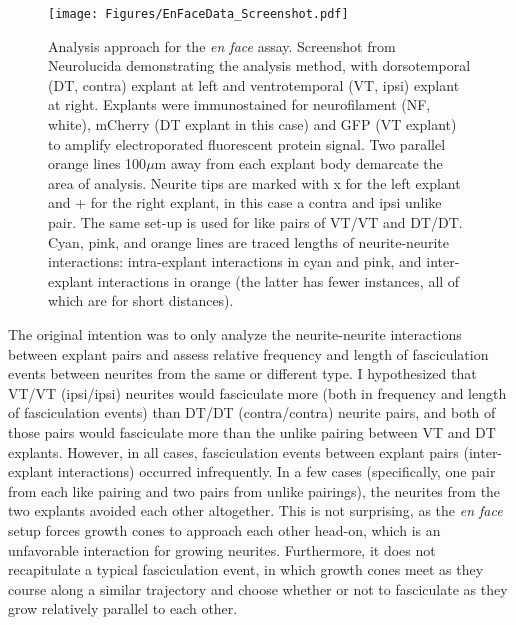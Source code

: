 \begin{figure}[hbtp]
    \begin{center}
        \texttt{[image: Figures/EnFaceData\_Screenshot.pdf]}
        \caption[Analysis approach for the \emph{en face} assay.]
        {Analysis approach for the \emph{en face} assay.
        Screenshot from Neurolucida demonstrating the analysis method, with dorsotemporal (DT, contra) explant at left and ventrotemporal (VT, ipsi) explant at right.
        Explants were immunostained for neurofilament (NF, white), mCherry (DT explant in this case) and GFP (VT explant) to amplify electroporated fluorescent protein signal.
        Two parallel orange lines 100$\mu$m away from each explant body demarcate the area of analysis.
        Neurite tips are marked with x for the left explant and + for the right explant, in this case a contra and ipsi unlike pair.
        The same set-up is used for like pairs of VT/VT and DT/DT.
        Cyan, pink, and orange lines are traced lengths of neurite-neurite interactions: intra-explant interactions in cyan and pink, and inter-explant interactions in orange (the latter has fewer instances, all of which are for short distances).}
        \label{EnFaceDataScreenshot}
    \end{center}
\end{figure}

The original intention was to only analyze the neurite-neurite interactions between explant pairs and assess relative frequency and length of fasciculation events between neurites from the same or different type.
I hypothesized that VT/VT (ipsi/ipsi) neurites would fasciculate more (both in frequency and length of fasciculation events) than DT/DT (contra/contra) neurite pairs, and both of those pairs would fasciculate more than the unlike pairing between VT and DT explants.
However, in all cases, fasciculation events between explant pairs (inter-explant interactions) occurred infrequently.
In a few cases (specifically, one pair from each like pairing and two pairs from unlike pairings), the neurites from the two explants avoided each other altogether.
This is not surprising, as the \emph{en face} setup forces growth cones to approach each other head-on, which is an unfavorable interaction for growing neurites.
Furthermore, it does not recapitulate a typical \invivo{} fasciculation event, in which growth cones meet as they course along a similar trajectory and choose whether or not to fasciculate as they grow relatively parallel to each other.

